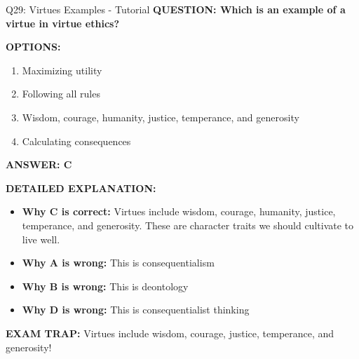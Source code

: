 \documentclass[8pt]{beamer}
\begin{document}
	\begin{frame}{Q29: Virtues Examples - Tutorial}
		\fontsize{6.5}{7.5}\selectfont
		\textbf{QUESTION: Which is an example of a virtue in virtue ethics?}
		
		\vspace{0.1cm}
		\textbf{OPTIONS:}
		\begin{enumerate}
			\item Maximizing utility
			\item Following all rules
			\item Wisdom, courage, humanity, justice, temperance, and generosity
			\item Calculating consequences
		\end{enumerate}
		
		\vspace{0.1cm}
		\textcolor{myblue}{\textbf{ANSWER: C}}
		
		\vspace{0.1cm}
		\textbf{DETAILED EXPLANATION:}
		\begin{itemize}
			\item \textbf{Why C is correct:} Virtues include wisdom, courage, humanity, justice, temperance, and generosity. These are character traits we should cultivate to live well.
			\item \textbf{Why A is wrong:} This is consequentialism
			\item \textbf{Why B is wrong:} This is deontology
			\item \textbf{Why D is wrong:} This is consequentialist thinking
		\end{itemize}
		
		\textcolor{myred}{\textbf{EXAM TRAP:}} Virtues include \textcolor{myblue}{wisdom, courage, justice, temperance, and generosity}!
	\end{frame}
	
\end{document}

